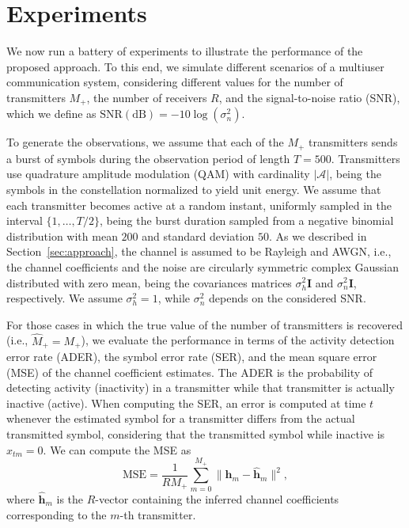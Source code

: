 \documentclass[a4paper]{article}
\def\hm{\mathbf{h}_m}
\def\hathm{\hat{\mathbf{h}}_m}
\def\xtm{x_{tm}}
\def\Acal{\mathcal{A}}
\begin{document}
\section{Experiments}
\label{sec:experiments}
We now run a battery of experiments to illustrate the performance of the proposed approach. To this end, we simulate different scenarios of a multiuser communication system, considering different values for the number of transmitters $M_+$, the number of receivers $R$, and the signal-to-noise ratio (SNR), which we define as $\mathrm{SNR (dB)} = -10 \log (\sigma^2_n)$. 

To generate the observations, we assume that each of the $M_+$ transmitters sends a burst of symbols during the observation period of length $T=500$. Transmitters use quadrature amplitude modulation (QAM) with cardinality $|\Acal|$, being the symbols in the constellation normalized to yield unit energy. We assume that each transmitter becomes active at a random instant, uniformly sampled in the interval $\{1, \ldots, T/2 \}$, being the burst duration sampled from a negative binomial distribution with mean $200$ and standard deviation $50$. As we described in Section~\ref{sec:approach}, the channel is assumed to be Rayleigh and AWGN, i.e., the channel coefficients and the noise are circularly symmetric complex Gaussian distributed with zero mean, being the covariances matrices $\sigma_h^2 \mathbf{I}$ and $\sigma_n^2 \mathbf{I}$, respectively. We assume $\sigma_h^2=1$, while $\sigma_n^2$ depends on the considered SNR.


For those cases in which the true value of the number of transmitters is recovered (i.e.,  $\hat{M}_+ =M_+$), we evaluate the performance in terms of the activity detection error rate (ADER), the symbol error rate (SER), and the mean square error (MSE) of the channel coefficient estimates. The ADER is the probability of detecting activity (inactivity) in a transmitter while that transmitter is actually inactive (active). When computing the SER, an error is computed at time $t$ whenever the estimated symbol for a transmitter differs from the actual transmitted symbol, considering that the transmitted symbol while inactive is $\xtm=0$. We can compute the MSE as
\begin{equation}
\mathrm{MSE} = \frac{1}{R M_+}  \sum_{m=0}^{M_+} \|\hm- \hathm\|^2,
\end{equation} 
where $\hathm$ is the $R$-vector containing the inferred channel coefficients corresponding to the $m$-th transmitter.
\end{document}
